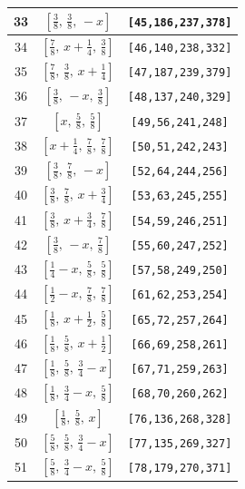 \documentclass[fleqn,8pt]{jsarticle}
\begin{document}
\begin{longtable}{ccc}
33 & $\left[ \frac{3}{8},\, \frac{3}{8},\, - x \right]$ & {\tt [45,186,237,378]} \\ \hline
34 & $\left[ \frac{7}{8},\, x + \frac{1}{4},\, \frac{3}{8} \right]$ & {\tt [46,140,238,332]} \\ \hline
35 & $\left[ \frac{7}{8},\, \frac{3}{8},\, x + \frac{1}{4} \right]$ & {\tt [47,187,239,379]} \\ \hline
36 & $\left[ \frac{3}{8},\, - x,\, \frac{3}{8} \right]$ & {\tt [48,137,240,329]} \\ \hline
37 & $\left[ x,\, \frac{5}{8},\, \frac{5}{8} \right]$ & {\tt [49,56,241,248]} \\ \hline
38 & $\left[ x + \frac{1}{4},\, \frac{7}{8},\, \frac{7}{8} \right]$ & {\tt [50,51,242,243]} \\ \hline
39 & $\left[ \frac{3}{8},\, \frac{7}{8},\, - x \right]$ & {\tt [52,64,244,256]} \\ \hline
40 & $\left[ \frac{3}{8},\, \frac{7}{8},\, x + \frac{3}{4} \right]$ & {\tt [53,63,245,255]} \\ \hline
41 & $\left[ \frac{3}{8},\, x + \frac{3}{4},\, \frac{7}{8} \right]$ & {\tt [54,59,246,251]} \\ \hline
42 & $\left[ \frac{3}{8},\, - x,\, \frac{7}{8} \right]$ & {\tt [55,60,247,252]} \\ \hline
43 & $\left[ \frac{1}{4} - x,\, \frac{5}{8},\, \frac{5}{8} \right]$ & {\tt [57,58,249,250]} \\ \hline
44 & $\left[ \frac{1}{2} - x,\, \frac{7}{8},\, \frac{7}{8} \right]$ & {\tt [61,62,253,254]} \\ \hline
45 & $\left[ \frac{1}{8},\, x + \frac{1}{2},\, \frac{5}{8} \right]$ & {\tt [65,72,257,264]} \\ \hline
46 & $\left[ \frac{1}{8},\, \frac{5}{8},\, x + \frac{1}{2} \right]$ & {\tt [66,69,258,261]} \\ \hline
47 & $\left[ \frac{1}{8},\, \frac{5}{8},\, \frac{3}{4} - x \right]$ & {\tt [67,71,259,263]} \\ \hline
48 & $\left[ \frac{1}{8},\, \frac{3}{4} - x,\, \frac{5}{8} \right]$ & {\tt [68,70,260,262]} \\ \hline
49 & $\left[ \frac{1}{8},\, \frac{5}{8},\, x \right]$ & {\tt [76,136,268,328]} \\ \hline
50 & $\left[ \frac{5}{8},\, \frac{5}{8},\, \frac{3}{4} - x \right]$ & {\tt [77,135,269,327]} \\ \hline
51 & $\left[ \frac{5}{8},\, \frac{3}{4} - x,\, \frac{5}{8} \right]$ & {\tt [78,179,270,371]} \\ \hline

\end{longtable}
\end{document}
